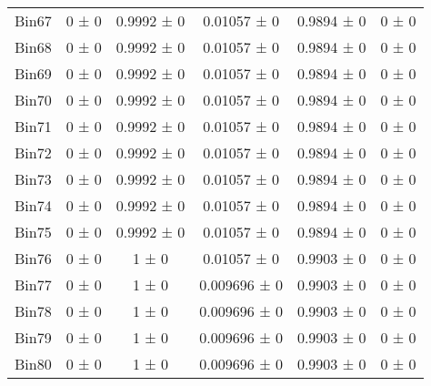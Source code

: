 \begin{tabular}{@{\extracolsep{4pt}}lccccc@{}}
     Bin67 & 0 ± 0 & 0.9992 ± 0 & 0.01057 ± 0 & 0.9894 ± 0 & 0 ± 0 \\ 
     Bin68 & 0 ± 0 & 0.9992 ± 0 & 0.01057 ± 0 & 0.9894 ± 0 & 0 ± 0 \\ 
     Bin69 & 0 ± 0 & 0.9992 ± 0 & 0.01057 ± 0 & 0.9894 ± 0 & 0 ± 0 \\ 
     Bin70 & 0 ± 0 & 0.9992 ± 0 & 0.01057 ± 0 & 0.9894 ± 0 & 0 ± 0 \\ 
     Bin71 & 0 ± 0 & 0.9992 ± 0 & 0.01057 ± 0 & 0.9894 ± 0 & 0 ± 0 \\ 
     Bin72 & 0 ± 0 & 0.9992 ± 0 & 0.01057 ± 0 & 0.9894 ± 0 & 0 ± 0 \\ 
     Bin73 & 0 ± 0 & 0.9992 ± 0 & 0.01057 ± 0 & 0.9894 ± 0 & 0 ± 0 \\ 
     Bin74 & 0 ± 0 & 0.9992 ± 0 & 0.01057 ± 0 & 0.9894 ± 0 & 0 ± 0 \\ 
     Bin75 & 0 ± 0 & 0.9992 ± 0 & 0.01057 ± 0 & 0.9894 ± 0 & 0 ± 0 \\ 
     Bin76 & 0 ± 0 & 1 ± 0 & 0.01057 ± 0 & 0.9903 ± 0 & 0 ± 0 \\ 
     Bin77 & 0 ± 0 & 1 ± 0 & 0.009696 ± 0 & 0.9903 ± 0 & 0 ± 0 \\ 
     Bin78 & 0 ± 0 & 1 ± 0 & 0.009696 ± 0 & 0.9903 ± 0 & 0 ± 0 \\ 
     Bin79 & 0 ± 0 & 1 ± 0 & 0.009696 ± 0 & 0.9903 ± 0 & 0 ± 0 \\ 
     Bin80 & 0 ± 0 & 1 ± 0 & 0.009696 ± 0 & 0.9903 ± 0 & 0 ± 0 \\ 
\hline\hline
  \end{tabular}
